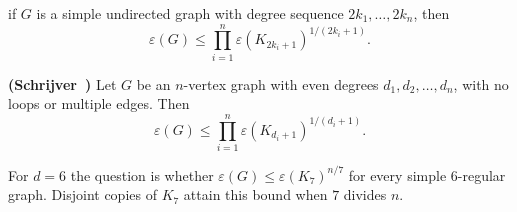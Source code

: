 if $G$ is a simple undirected graph with
degree sequence $2k_1,\ldots,2k_n$, then
\[
  \varepsilon(G)\leq
  \prod_{i=1}^n \varepsilon(K_{2k_i+1})^{1/(2k_i+1)}.
  \tag{22}
\]

\begin{conjecture} {\bf (Schrijver~\cite{Sch83})} \label{conj:schrijver-degrees}
Let $G$ be an $n$-vertex graph with even degrees $d_1,d_2,\dots,d_n$, with no loops or multiple edges. Then
\[
\varepsilon(G)\le \prod_{i=1}^n \varepsilon(K_{d_i+1})^{1/(d_i+1)}.
\]
\end{conjecture}

For $d=6$ the
question is whether $\varepsilon(G)\le\varepsilon(K_7)^{n/7}$ for every
simple $6$-regular graph. Disjoint copies of $K_7$ attain this bound when
$7$ divides $n$.
